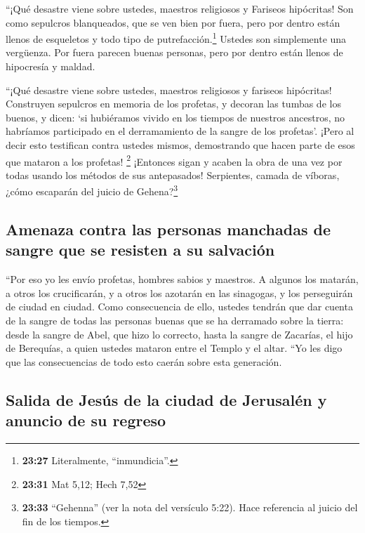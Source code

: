  ``¡Qué desastre viene sobre ustedes, maestros religiosos
y Fariseos hipócritas! Son como sepulcros blanqueados, que se ven bien
por fuera, pero por dentro están llenos de esqueletos y todo tipo de
putrefacción.\footnote{\textbf{23:27} Literalmente, ``inmundicia''.}
 Ustedes son simplemente una vergüenza. Por fuera parecen
buenas personas, pero por dentro están llenos de hipocresía y maldad.

 ``¡Qué desastre viene sobre ustedes, maestros religiosos
y fariseos hipócritas! Construyen sepulcros en memoria de los profetas,
y decoran las tumbas de los buenos,  y dicen: `si
hubiéramos vivido en los tiempos de nuestros ancestros, no habríamos
participado en el derramamiento de la sangre de los profetas'.
 ¡Pero al decir esto testifican contra ustedes mismos,
demostrando que hacen parte de esos que mataron a los profetas!
\footnote{\textbf{23:31} Mat 5,12; Hech 7,52}  ¡Entonces
sigan y acaben la obra de una vez por todas usando los métodos de sus
antepasados!  Serpientes, camada de víboras, ¿cómo
escaparán del juicio de Gehena?\footnote{\textbf{23:33} ``Gehenna'' (ver
  la nota del versículo 5:22). Hace referencia al juicio del fin de los
  tiempos.}

\hypertarget{amenaza-contra-las-personas-manchadas-de-sangre-que-se-resisten-a-su-salvaciuxf3n}{%
\subsection{Amenaza contra las personas manchadas de sangre que se
resisten a su
salvación}\label{amenaza-contra-las-personas-manchadas-de-sangre-que-se-resisten-a-su-salvaciuxf3n}}

 ``Por eso yo les envío profetas, hombres sabios y
maestros. A algunos los matarán, a otros los crucificarán, y a otros los
azotarán en las sinagogas, y los perseguirán de ciudad en ciudad.
 Como consecuencia de ello, ustedes tendrán que dar
cuenta de la sangre de todas las personas buenas que se ha derramado
sobre la tierra: desde la sangre de Abel, que hizo lo correcto, hasta la
sangre de Zacarías, el hijo de Berequías, a quien ustedes mataron entre
el Templo y el altar.  ``Yo les digo que las
consecuencias de todo esto caerán sobre esta generación.

\hypertarget{salida-de-jesuxfas-de-la-ciudad-de-jerusaluxe9n-y-anuncio-de-su-regreso}{%
\subsection{Salida de Jesús de la ciudad de Jerusalén y anuncio de su
regreso}\label{salida-de-jesuxfas-de-la-ciudad-de-jerusaluxe9n-y-anuncio-de-su-regreso}}

